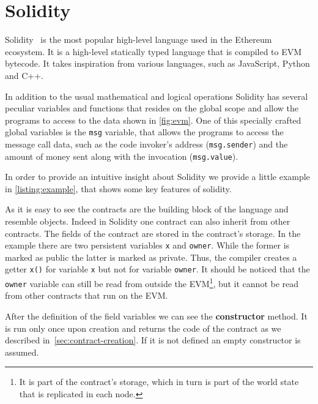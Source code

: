 \section{Solidity}
\label{sec:solidity}
Solidity~\cite{bib:solidity-docs} is the most popular
high-level language used in the Ethereum ecosystem.
It is a high-level statically typed language that is compiled to EVM bytecode.
It takes inspiration from various languages, such as JavaScript, Python and C++.

In addition to the usual mathematical and logical operations Solidity has
several peculiar variables and functions that resides on the global scope and
allow the programs to access to the data shown in \autoref{fig:evm}. 
One of this specially crafted global variables is the \texttt{msg} variable,
that allows the programs to access the message call data,
such as the code invoker's address (\texttt{msg.sender}) and the amount of 
money sent along with the invocation (\texttt{msg.value}).

In order to provide an intuitive insight about Solidity we provide a little
example in \autoref{listing:example}, that shows some key features of solidity.

\begin{figure}

\end{figure}

As it is easy to see the contracts are the building block of the language and
resemble objects. Indeed in Solidity one contract can also inherit from other
contracts.
The fields of the contract are stored in the contract's storage. In the example
there are two persistent variables \verb|x| and \verb|owner|. While the former
is marked as public the latter is marked as private. Thus, the compiler
creates a getter \verb|x()| for variable \verb|x| but not for variable 
\verb|owner|. It should be noticed that the \verb|owner| variable can still
be read from outside the EVM\footnote{It is part of the contract's storage,
which in turn is part of the world state that is replicated in each node.}, 
but it cannot be read from other contracts that run on the EVM.


After the definition of the field variables we can see the \textbf{constructor}
method. It is run only once upon creation and returns the code of the contract
as we described in~\autoref{sec:contract-creation}. If it is not defined
an empty constructor is assumed.

